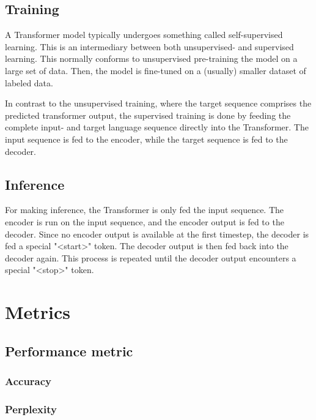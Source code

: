 \subsection{Training}
\label{sec:transformer-training}
A Transformer model typically undergoes something called self-supervised learning. This is an intermediary between both unsupervised- and supervised learning. This normally conforms to unsupervised pre-training the model on a large set of data. Then, the model is fine-tuned on a (usually) smaller dataset of labeled data.

In contrast to the unsupervised training, where the target sequence comprises the predicted transformer output, the supervised training is done by feeding the complete input- and target language sequence directly into the Transformer. The input sequence is fed to the encoder, while the target sequence is fed to the decoder.

\subsection{Inference}
\label{sec:transformer-inference}
For making inference, the Transformer is only fed the input sequence. The encoder is run on the input sequence, and the encoder output is fed to the decoder. Since no encoder output is available at the first timestep, the decoder is fed a special "<start>" token. The decoder output is then fed back into the decoder again. This process is repeated until the decoder output encounters a special "<stop>" token.


\section{Metrics}
\label{sec:metrics}

\subsection{Performance metric}
\label{sec:performance-metric}

\subsubsection{Accuracy}
\label{sec:accuracy}

\subsubsection{Perplexity}
\label{sec:perplexity}

